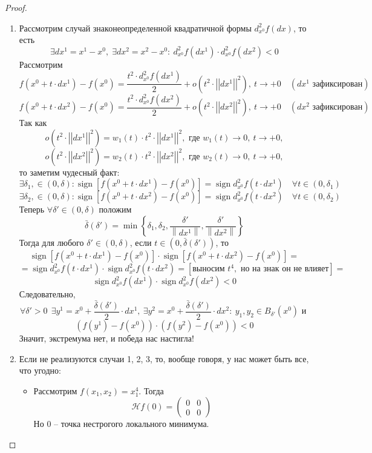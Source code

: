 \documentclass[11pt]{article}
\DeclareMathOperator{\sign}{sign}
\begin{document}
\begin{proof}
\begin{enumerate}
        \item Рассмотрим случай знаконеопределенной квадратичной формы $d^2_{x^0}f(dx)$, то есть 
        \[\exists dx^1 = x^1 - x^0, \; \exists dx^2 = x^2 - x^0: \ d^2_{x^0}f(dx^1) \cdot d^2_{x^0}f(dx^2) < 0\]
        Рассмотрим \[f(x^0 + t \cdot dx^1) - f(x^0) = \frac{t^2 \cdot d^2_{x^0}f(dx^1)}{2} +
        o\left(t^2 \cdot \left|\left|dx^1\right|\right|^2\right), \ t \to +0 \quad (dx^1 \text{ зафиксирован})\]
        \[f(x^0 + t \cdot dx^2) - f(x^0) = \frac{t^2 \cdot d^2_{x^0}f(dx^2)}{2} +
        o\left(t^2 \cdot \left|\left|dx^2\right|\right|^2\right), \ t \to +0 \quad (dx^2 \text{ зафиксирован})\]
        Так как \[o\left(t^2 \cdot \left|\left|dx^1\right|\right|^2\right) = w_1(t) \cdot t^2 \cdot 
        \left|\left|dx^1\right|\right|^2, \text{ где } w_1(t) \to 0, \ t \to +0,\]
        \[o\left(t^2 \cdot \left|\left|dx^2\right|\right|^2\right) = w_2(t) \cdot t^2 \cdot 
        \left|\left|dx^2\right|\right|^2, \text{ где } w_2(t) \to 0, \ t \to +0,\] 
        то заметим чудесный факт: 
        \[\exists \delta_1, \in (0, \delta): \sign\left[f(x^0 + t \cdot dx^1) - f(x^0)\right] =
        \sign d^2_{x^0}f(t \cdot dx^1) \quad \forall t \in (0, \delta_1)\]
        \[\exists \delta_2, \in (0, \delta): \sign\left[f(x^0 + t \cdot dx^2) - f(x^0)\right] =
        \sign d^2_{x^0}f(t \cdot dx^2) \quad \forall t \in (0, \delta_2)\]
        Теперь $\forall \delta' \in (0, \delta)$ положим 
        \[\bar{\delta} (\delta') = \min \left\{\delta_1, \delta_2, \frac{\delta'}{\left\lVert dx^1 \right\rVert}, 
        \frac{\delta'}{\left\lVert dx^2 \right\rVert}\right\}\]
        Тогда для любого $\delta' \in (0, \delta)$, если $t \in (0, \bar{\delta}(\delta'))$, то \[\sign\left[f\left(x^0 + t \cdot 
        dx^1\right) - f\left(x^0\right)\right] \cdot \sign \left[f\left(x^0 + t \cdot 
        dx^2\right) - f\left(x^0\right)\right] = \]
        \[= \sign d^2_{x^0}f(t \cdot dx^1) \cdot \sign d^2_{x^0}f(t \cdot dx^2) = 
        \left[\text{выносим } t^4, \text{ но на знак он не влияет}\right] =\] 
        \[\sign d^2_{x^0}f(dx^1) \cdot \sign d^2_{x^0}f(dx^2) < 0\]
        Следовательно, \[\forall \delta' > 0 \ \ \exists y^1 = x^0 + \frac{\bar{\delta}(\delta')}{2}
        \cdot dx^1, \ \exists y^2 = x^0 + \frac{\bar{\delta}(\delta')}{2} \cdot dx^2: \ y_1, y_2
        \in B_{\delta'}(x^0) \text{ и }\]
        \[\left(f(y^1) - f(x^0)\right) \cdot \left(f(y^2) - f(x^0)\right) < 0\]
        Значит, экстремума нет, и победа нас настигла!

        \item Если не реализуются случаи 1, 2, 3, то, вообще говоря, у нас может быть
        все, что угодно:
        \begin{itemize}
            \item Рассмотрим $f(x_1, x_2) = x_1^4$. Тогда 
            \[\mathcal{H}f(0) = \begin{pmatrix}
                0 & 0 \\ 0 & 0
            \end{pmatrix}\]
            Но $0$ -- точка нестрогого локального минимума.


\end{itemize}
\end{enumerate}
\end{proof}
\end{document}
